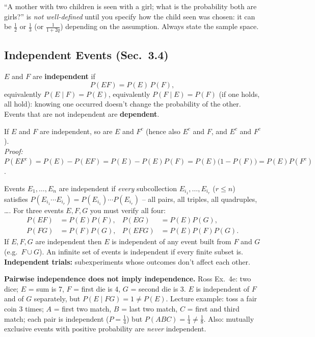\documentclass[11pt]{article}
\let\oldsubsection\subsection
\renewcommand{\subsection}{\Needspace{14\baselineskip}\oldsubsection}
\begin{document}
\begin{warnbox}
``A mother with two children is seen with a girl; what is the probability both are girls?'' is \emph{not well-defined} until you specify how the child seen was chosen: it can be $\frac12$ or $\frac13$ (or $\frac1{1+2q}$) depending on the assumption. Always state the sample space.
\end{warnbox}

\subsection{Independent Events (Sec.\ 3.4)}

\begin{defbox}
$E$ and $F$ are \textbf{independent} if
\[ P(EF)=P(E)\,P(F), \]
equivalently $P(E\mid F)=P(E)$, equivalently $P(F\mid E)=P(F)$ (if one holds, all hold): knowing one occurred doesn't change the probability of the other. Events that are not independent are \textbf{dependent}.
\end{defbox}

\begin{thmbox}
If $E$ and $F$ are independent, so are $E$ and $F^c$ (hence also $E^c$ and $F$, and $E^c$ and $F^c$).\\
\emph{Proof:} $P(EF^c)=P(E)-P(EF)=P(E)-P(E)P(F)=P(E)\big(1-P(F)\big)=P(E)P(F^c)$.
\end{thmbox}

\begin{defbox}
Events $E_1,\dots,E_n$ are independent if \emph{every} subcollection $E_{i_1},\dots,E_{i_r}$ ($r\le n$) satisfies $P(E_{i_1}\cdots E_{i_r})=P(E_{i_1})\cdots P(E_{i_r})$ -- all pairs, all triples, all quadruples, \dots. For three events $E,F,G$ you must verify all four:
\begin{align*}
P(EF)&=P(E)P(F), & P(EG)&=P(E)P(G),\\
P(FG)&=P(F)P(G), & P(EFG)&=P(E)P(F)P(G).
\end{align*}
If $E,F,G$ are independent then $E$ is independent of any event built from $F$ and $G$ (e.g.\ $F\cup G$). An infinite set of events is independent if every finite subset is. \textbf{Independent trials:} subexperiments whose outcomes don't affect each other.
\end{defbox}

\begin{warnbox}
\textbf{Pairwise independence does not imply independence.} Ross Ex.\ 4e: two dice; $E$ = sum is 7, $F$ = first die is 4, $G$ = second die is 3. $E$ is independent of $F$ and of $G$ separately, but $P(E\mid FG)=1\ne P(E)$. Lecture example: toss a fair coin 3 times; $A$ = first two match, $B$ = last two match, $C$ = first and third match; each pair is independent ($P=\frac14$) but $P(ABC)=\frac14\ne\frac18$. Also: mutually exclusive events with positive probability are \emph{never} independent.
\end{warnbox}
\end{document}

